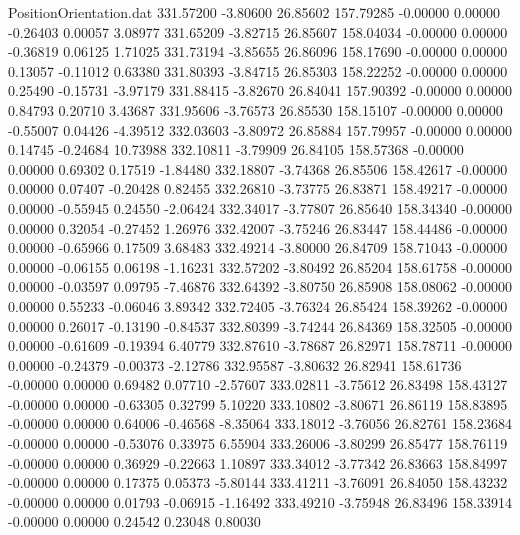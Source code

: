 \begin{filecontents}{PositionOrientation.dat}
 331.57200   -3.80600   26.85602   157.79285   -0.00000    0.00000   -0.26403    0.00057    3.08977
 331.65209   -3.82715   26.85607   158.04034   -0.00000    0.00000   -0.36819    0.06125    1.71025
 331.73194   -3.85655   26.86096   158.17690   -0.00000    0.00000    0.13057   -0.11012    0.63380
 331.80393   -3.84715   26.85303   158.22252   -0.00000    0.00000    0.25490   -0.15731   -3.97179
 331.88415   -3.82670   26.84041   157.90392   -0.00000    0.00000    0.84793    0.20710    3.43687
 331.95606   -3.76573   26.85530   158.15107   -0.00000    0.00000   -0.55007    0.04426   -4.39512
 332.03603   -3.80972   26.85884   157.79957   -0.00000    0.00000    0.14745   -0.24684   10.73988
 332.10811   -3.79909   26.84105   158.57368   -0.00000    0.00000    0.69302    0.17519   -1.84480
 332.18807   -3.74368   26.85506   158.42617   -0.00000    0.00000    0.07407   -0.20428    0.82455
 332.26810   -3.73775   26.83871   158.49217   -0.00000    0.00000   -0.55945    0.24550   -2.06424
 332.34017   -3.77807   26.85640   158.34340   -0.00000    0.00000    0.32054   -0.27452    1.26976
 332.42007   -3.75246   26.83447   158.44486   -0.00000    0.00000   -0.65966    0.17509    3.68483
 332.49214   -3.80000   26.84709   158.71043   -0.00000    0.00000   -0.06155    0.06198   -1.16231
 332.57202   -3.80492   26.85204   158.61758   -0.00000    0.00000   -0.03597    0.09795   -7.46876
 332.64392   -3.80750   26.85908   158.08062   -0.00000    0.00000    0.55233   -0.06046    3.89342
 332.72405   -3.76324   26.85424   158.39262   -0.00000    0.00000    0.26017   -0.13190   -0.84537
 332.80399   -3.74244   26.84369   158.32505   -0.00000    0.00000   -0.61609   -0.19394    6.40779
 332.87610   -3.78687   26.82971   158.78711   -0.00000    0.00000   -0.24379   -0.00373   -2.12786
 332.95587   -3.80632   26.82941   158.61736   -0.00000    0.00000    0.69482    0.07710   -2.57607
 333.02811   -3.75612   26.83498   158.43127   -0.00000    0.00000   -0.63305    0.32799    5.10220
 333.10802   -3.80671   26.86119   158.83895   -0.00000    0.00000    0.64006   -0.46568   -8.35064
 333.18012   -3.76056   26.82761   158.23684   -0.00000    0.00000   -0.53076    0.33975    6.55904
 333.26006   -3.80299   26.85477   158.76119   -0.00000    0.00000    0.36929   -0.22663    1.10897
 333.34012   -3.77342   26.83663   158.84997   -0.00000    0.00000    0.17375    0.05373   -5.80144
 333.41211   -3.76091   26.84050   158.43232   -0.00000    0.00000    0.01793   -0.06915   -1.16492
 333.49210   -3.75948   26.83496   158.33914   -0.00000    0.00000    0.24542    0.23048    0.80030

\end{filecontents}
